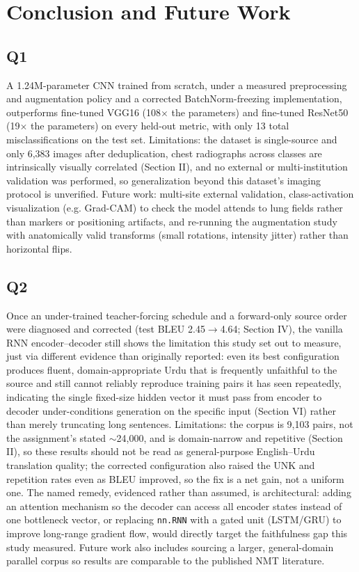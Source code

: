 \documentclass[conference]{IEEEtran}
\begin{document}
\section{Conclusion and Future Work}

\subsection{Q1}
A 1.24M-parameter CNN trained from scratch, under a measured
preprocessing and augmentation policy and a corrected BatchNorm-freezing
implementation, outperforms fine-tuned VGG16 (108$\times$ the
parameters) and fine-tuned ResNet50 (19$\times$ the parameters) on
every held-out metric, with only 13 total misclassifications on the
test set. Limitations: the dataset is single-source and only 6,383
images after deduplication, chest radiographs across classes are
intrinsically visually correlated (Section II), and no external or
multi-institution validation was performed, so generalization beyond
this dataset's imaging protocol is unverified. Future work: multi-site
external validation, class-activation visualization (e.g. Grad-CAM) to
check the model attends to lung fields rather than markers or
positioning artifacts, and re-running the augmentation study with
anatomically valid transforms (small rotations, intensity jitter)
rather than horizontal flips.

\subsection{Q2}
Once an under-trained teacher-forcing schedule and a forward-only
source order were diagnosed and corrected (test BLEU 2.45$\to$4.64;
Section IV), the vanilla RNN encoder--decoder still shows the
limitation this study set out to measure, just via different evidence
than originally reported: even its best configuration produces fluent,
domain-appropriate Urdu that is frequently unfaithful to the source and
still cannot reliably reproduce training pairs it has seen repeatedly,
indicating the single fixed-size hidden vector it must pass from
encoder to decoder under-conditions generation on the specific input
(Section VI) rather than merely truncating long sentences. Limitations:
the corpus is 9,103 pairs, not the assignment's stated $\sim$24,000,
and is domain-narrow and repetitive (Section II), so these results
should not be read as general-purpose English--Urdu translation
quality; the corrected configuration also raised the UNK and repetition
rates even as BLEU improved, so the fix is a net gain, not a uniform
one. The named remedy, evidenced rather than assumed, is architectural:
adding an attention mechanism \cite{bahdanau2015attention} so the
decoder can access all encoder states instead of one bottleneck vector,
or replacing \texttt{nn.RNN} with a gated unit (LSTM/GRU) to improve
long-range gradient flow, would directly target the faithfulness gap
this study measured. Future work also includes sourcing a larger,
general-domain parallel corpus so results are comparable to the
published NMT literature.
\end{document}
